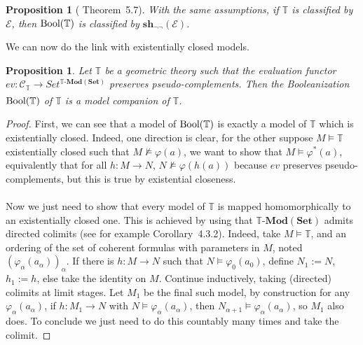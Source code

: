 \documentclass{article}
\newtheorem{proposition}[theorem]{Proposition}
\newcommand{\T}{\mathbb{T}}
\renewcommand{\phi}{\varphi}
\newcommand{\Set}{\mathbf{Set}}
\newcommand{\Mod}{{\mathbf{Mod}}}
\begin{document}
\begin{proposition}[\cite{caramello2009morgan} Theorem~5.7]
    With the same assumptions, if $\T$ is classified by $\mathcal{E}$, then $\textup{Bool}(\T)$ is classified by $\mathbf{sh}_{\neg\neg}(\mathcal{E})$.
\end{proposition}

We can now do the link with existentially closed models.

\begin{proposition}
    Let $\T$ be a geometric theory such that the evaluation functor $ev:\mathcal{C}_{\T}\xrightarrow[]{}Set^{\T\text{-}\Mod(\Set)}$ preserves pseudo-complements. Then the Booleanization $\textup{Bool}(\T)$ of $\T$ is a model companion of $\T$.
\end{proposition}
\begin{proof}
    First, we can see that a model of $\textup{Bool}(\T)$ is exactly a model of $\T$ which is existentially closed. Indeed, one direction is clear, for the other suppose $M\models\T$ existentially closed such that $M\not\models\phi(a)$, we want to show that $M\models\phi^*(a)$, equivalently that for all $h:M\xrightarrow{}N$, $N\not\models\phi(h(a))$ because $ev$ preserves pseudo-complements, but this is true by existential closeness.\\
    \\
    Now we just need to show that every model of $\T$ is mapped homomorphically to an existentially closed one. This is achieved by using that $\T\text{-}\Mod(\Set)$ admits directed colimits (see for example \cite{borceux1994handbook} Corollary~4.3.2). Indeed, take $M\models\T$, and an ordering of the set of coherent formulas with parameters in $M$, noted $(\phi_\alpha(a_\alpha))_\alpha$. If there is $h:M\xrightarrow{}N$ such that $N\models\phi_0(a_0)$, define $N_1:=N$, $h_1:=h$, else take the identity on $M$. Continue inductively, taking (directed) colimits at limit stages. Let $M_1$ be the final such model, by construction for any $\phi_\alpha(a_\alpha)$, if $h:M_1\xrightarrow{}N$ with $N\models\phi_\alpha(a_\alpha)$, then $N_{\alpha+1}\models\phi_\alpha(a_\alpha)$, so $M_1$ also does. To conclude we just need to do this countably many times and take the colimit.
\end{proof}
\end{document}
